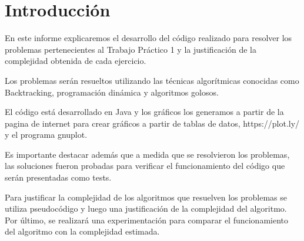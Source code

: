 \section{Introducción}

En este informe explicaremos el desarrollo del código realizado para resolver los problemas pertenecientes al Trabajo Práctico 1 y la justificación de la complejidad obtenida de cada ejercicio.

Los problemas serán resueltos utilizando las técnicas algorítmicas conocidas como Backtracking, programación dinámica y algoritmos golosos. 

El código está desarrollado en Java y los gráficos los generamos a partir de la pagina de internet para crear gráficos a partir de tablas de datos, https://plot.ly/ y el programa gnuplot.

Es importante destacar además que a medida que se resolvieron los problemas, las soluciones fueron probadas para verificar el funcionamiento del código que serán presentadas como tests.

Para justificar la complejidad de los algoritmos que resuelven los problemas se utiliza pseudocódigo 
y luego una justificación de la complejidad del algoritmo. Por último, se realizará una experimentación para comparar el funcionamiento del algoritmo con la complejidad estimada.
